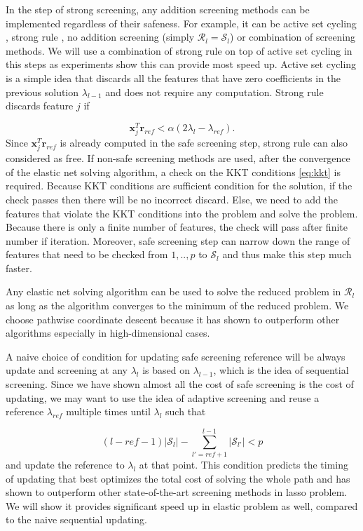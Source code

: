 In the step of strong screening, any addition screening methods can be implemented regardless of their safeness. For example, it can be active set cycling \citep{lee2007efficient}, strong rule \citep{Tibshirani2012}, no addition screening (simply $\mathcal{R}_l=\mathcal{S}_l$) or combination of screening methods. We will use a combination of strong rule on top of active set cycling in this steps as experiments show this can provide most speed up. Active set cycling is a simple idea that discards all the features that have zero coefficients in the previous solution $\lambda_{l-1}$ and does not require any computation. Strong rule discards feature $j$ if

\begin{equation}
    \label{eq:strong}
    \boldsymbol x_j^T\boldsymbol r_{ref}<\alpha(2\lambda_l-\lambda_{ref}).
\end{equation}
Since $\boldsymbol x_j^T\boldsymbol r_{ref}$ is already computed in the safe screening step, strong rule can also considered as free. If non-safe screening methods are used, after the convergence of the elastic net solving algorithm, a check on the KKT conditions \eqref{eq:kkt} is required. Because KKT conditions are sufficient condition for the solution, if the check passes then there will be no incorrect discard. Else, we need to add the features that violate the KKT conditions into the problem and solve the problem. Because there is only a finite number of features, the check will pass after finite number if iteration. Moreover, safe screening step can narrow down the range of features that need to be checked from $1,..,p$ to $\mathcal{S}_l$ and thus make this step much faster.

Any elastic net solving algorithm can be used to solve the reduced problem in $\mathcal{R}_l$ as long as the algorithm converges to the minimum of the reduced problem. We choose pathwise coordinate descent \citep{friedman2007pathwise} because it has shown to outperform other algorithms especially in high-dimensional cases.

A naive choice of condition for updating safe screening reference will be always update and screening at any $\lambda_l$ is based on $\lambda_{l-1}$, which is the idea of sequential screening. Since we have shown almost all the cost of safe screening is the cost of updating, we may want to use the idea of adaptive screening \citep{wang2021adaptive} and reuse a reference $\lambda_{ref}$ multiple times until $\lambda_l$ such that

\begin{equation}
    (l-ref-1)|\mathcal{S}_{l}|-\sum_{l'=ref+1}^{l-1}|\mathcal{S}_{l'}|<p
\end{equation}
and update the reference to $\lambda_l$ at that point. This condition predicts the timing of updating that best optimizes the total cost of solving the whole path and has shown to outperform other state-of-the-art screening methods in lasso problem. We will show it provides significant speed up in elastic problem as well, compared to the naive sequential updating.

